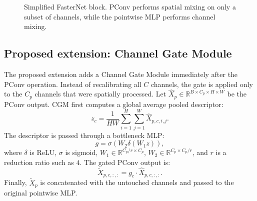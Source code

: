 \documentclass{article}
\begin{document}
\begin{figure}[t]
\centering
{}
\caption{Simplified FasterNet block. PConv performs spatial mixing on only a subset of channels, while the pointwise MLP performs channel mixing.}
\label{fig:base_block}
\end{figure}

\subsection{Proposed extension: Channel Gate Module}

The proposed extension adds a Channel Gate Module immediately after the PConv operation. Instead of recalibrating all $C$ channels, the gate is applied only to the $C_p$ channels that were spatially processed. Let $\hat{X}_p \in \mathbb{R}^{B \times C_p \times H \times W}$ be the PConv output. CGM first computes a global average pooled descriptor:
\begin{equation}
z_c = \frac{1}{HW}\sum_{i=1}^{H}\sum_{j=1}^{W} \hat{X}_{p,c,i,j}.
\end{equation}
The descriptor is passed through a bottleneck MLP:
\begin{equation}
g = \sigma(W_2 \delta(W_1 z)),
\end{equation}
where $\delta$ is ReLU, $\sigma$ is sigmoid, $W_1 \in \mathbb{R}^{C_p/r \times C_p}$, $W_2 \in \mathbb{R}^{C_p \times C_p/r}$, and $r$ is a reduction ratio such as $4$. The gated PConv output is:
\begin{equation}
\tilde{X}_{p,c,:,:} = g_c \cdot \hat{X}_{p,c,:,:}.
\end{equation}
Finally, $\tilde{X}_p$ is concatenated with the untouched channels and passed to the original pointwise MLP.
\end{document}
